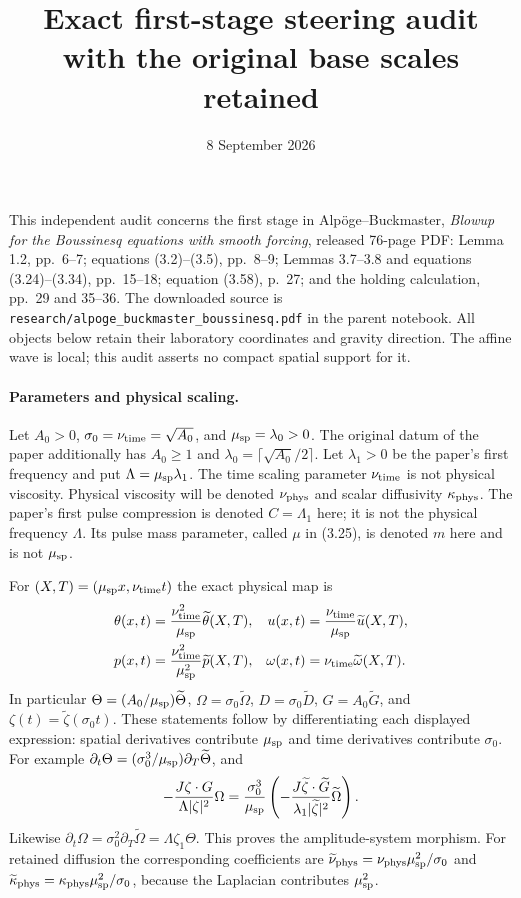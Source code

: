 \documentclass[11pt]{article}
\title{Exact first-stage steering audit with the original base scales retained}
\author{}
\date{8 September 2026}
\begin{document}
\maketitle

This independent audit concerns the first stage in Alp\"oge--Buckmaster,
\emph{Blowup for the Boussinesq equations with smooth forcing}, released
76-page PDF: Lemma 1.2, pp.~6--7; equations (3.2)--(3.5), pp.~8--9;
Lemmas 3.7--3.8 and equations (3.24)--(3.34), pp.~15--18; equation
(3.58), p.~27; and the holding calculation, pp.~29 and 35--36.
The downloaded source is
\texttt{research/alpoge\_buckmaster\_boussinesq.pdf} in the parent notebook.
All objects below retain their laboratory coordinates and gravity direction.
The affine wave is local; this audit asserts no compact spatial support for it.

\paragraph{Parameters and physical scaling.}
Let $A_0>0$, $\sigma _0=\nu_{\rm time}=\sqrt{A_0}$, and
$\mu_{\rm sp}=\lambda _0>0$. The original datum of the paper additionally
has $A_0\geq1$ and $\lambda _0=\lceil\sqrt{A_0}/2\rceil$.
Let $\lambda _1>0$ be the paper's first frequency and put
$\Lambda=\mu_{\rm sp}\lambda _1$. The time scaling parameter
$\nu_{\rm time}$ is not physical viscosity. Physical viscosity will be
denoted $\nu_{\rm phys}$ and scalar diffusivity $\kappa_{\rm phys}$.
The paper's first pulse compression is denoted $C=\Lambda _1$ here;
it is not the physical frequency $\Lambda$. Its pulse mass parameter,
called $\mu$ in (3.25), is denoted $m$ here and is not $\mu_{\rm sp}$.

For $(X,T)=(\mu_{\rm sp}x,\nu_{\rm time}t)$ the exact physical map is
\begin{align}
 \theta(x,t)&=\frac{\nu_{\rm time}^2}{\mu_{\rm sp}}
                   \widetilde\theta(X,T),&
 u(x,t)&=\frac{\nu_{\rm time}}{\mu_{\rm sp}}
                   \widetilde u(X,T),\\
 p(x,t)&=\frac{\nu_{\rm time}^2}{\mu_{\rm sp}^2}
                   \widetilde p(X,T),&
 \omega(x,t)&=\nu_{\rm time}\widetilde\omega(X,T).
\end{align}
In particular $\Theta=(A_0/\mu_{\rm sp})\widetilde\Theta$,
$\Omega=\sigma _0\widetilde\Omega$,
$D=\sigma _0\widetilde D$, $G=A_0\widetilde G$, and
$\zeta(t)=\widetilde\zeta(\sigma _0t)$. These statements follow by
differentiating each displayed expression: spatial derivatives contribute
$\mu_{\rm sp}$ and time derivatives contribute $\sigma _0$.
For example $\partial_t\Theta=(\sigma _0^3/\mu_{\rm sp})
\partial_T\widetilde\Theta$, and
\[
-\frac{J\zeta\cdot G}{\Lambda|\zeta|^2}\Omega
=\frac{\sigma _0^3}{\mu_{\rm sp}}
 \left(-\frac{J\widetilde\zeta\cdot\widetilde G}
 {\lambda _1|\widetilde\zeta|^2}\widetilde\Omega\right).
\]
Likewise $\partial_t\Omega=\sigma _0^2\partial_T\widetilde\Omega
=\Lambda\zeta_1\Theta$. This proves the amplitude-system morphism.
For retained diffusion the corresponding coefficients are
$\widetilde\nu_{\rm phys}=\nu_{\rm phys}\mu_{\rm sp}^2/\sigma _0$
and $\widetilde\kappa_{\rm phys}=\kappa_{\rm phys}\mu_{\rm sp}^2/\sigma _0$,
because the Laplacian contributes $\mu_{\rm sp}^2$.
\end{document}
